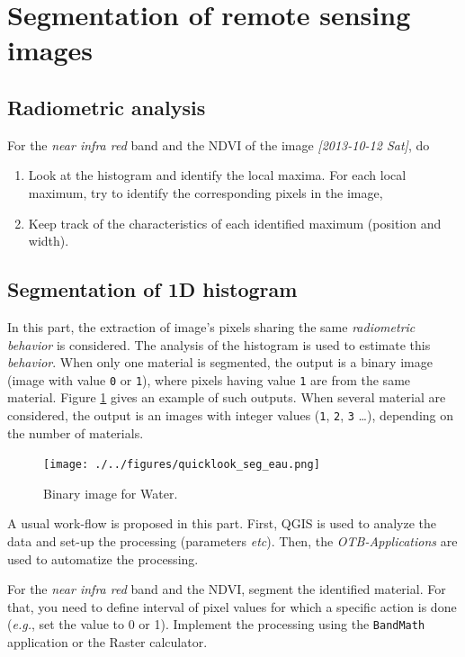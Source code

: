 \documentclass[a4paper,11pt,DIV=18]{scrartcl}
\begin{document}
\section{Segmentation of remote sensing images}
\label{sec:orgheadline24}
\subsection{Radiometric analysis}
\label{sec:orgheadline21}
\begin{work}
For   the  \emph{near   infra  red}   band  and   the  NDVI   of  the   image
\textit{[2013-10-12 Sat]}, do
\begin{enumerate}
\item Look  at the  histogram and  identify the  local maxima.   For each
local  maximum, try  to identify  the corresponding  pixels in  the
image,
\item Keep track  of  the characteristics  of  each identified  maximum
(position and width).
\end{enumerate}
\end{work}
\subsection{Segmentation of 1D histogram}
\label{sec:orgheadline22}
In  this part,  the  extraction  of image's  pixels  sharing the  same
\emph{radiometric behavior} is considered.  The  analysis of the histogram is
used to estimate this \emph{behavior}.   When only one material is segmented,
the output is a  binary image (image with value \texttt{0}  or \texttt{1}), where pixels
having  value \texttt{1}  are from  the same  material.  Figure  \ref{fig:orgparagraph4}
gives  an  example  of  such   outputs.   When  several  material  are
considered, the output is an images with integer values (\texttt{1}, \texttt{2}, \texttt{3} \ldots{}),
depending on the number of materials.

\begin{figure}[htb]
\centering
\texttt{[image: ./../figures/quicklook\_seg\_eau.png]}
\caption{\label{fig:orgparagraph4}
Binary image for Water.}
\end{figure}

A usual  work-flow is proposed  in this part.  First, QGIS is  used to
analyze the data and set-up the processing (parameters \emph{etc}). Then, the
\emph{OTB-Applications} are used to automatize the processing.

\begin{work}
For  the \emph{near  infra red}  band and  the NDVI,  segment the  identified
material. For  that, you need to  define interval of pixel  values for
which a  specific action  is done  (\emph{e.g.}, set  the value  to 0  or 1).
Implement the processing using the  \texttt{BandMath} application or the Raster
calculator.
\end{work}
\end{document}
